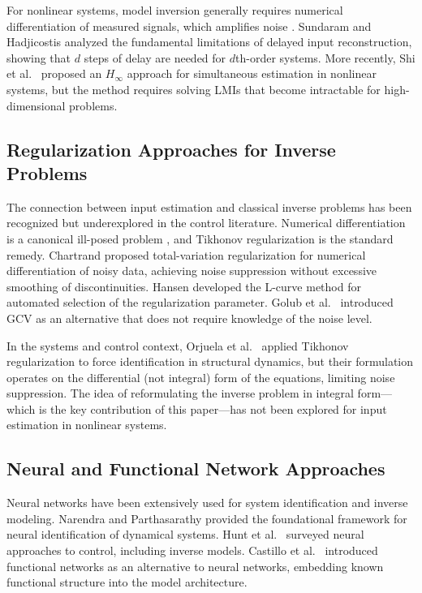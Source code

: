 \documentclass[lettersize,journal]{IEEEtran}
\begin{document}
For nonlinear systems, model inversion generally requires numerical differentiation of measured signals, which amplifies noise \cite{chartrand2011}. Sundaram and Hadjicostis \cite{sundaram2007} analyzed the fundamental limitations of delayed input reconstruction, showing that $d$ steps of delay are needed for $d$th-order systems. More recently, Shi et al.\ \cite{shi2016} proposed an $H_\infty$ approach for simultaneous estimation in nonlinear systems, but the method requires solving LMIs that become intractable for high-dimensional problems.

\subsection{Regularization Approaches for Inverse Problems}

The connection between input estimation and classical inverse problems has been recognized but underexplored in the control literature. Numerical differentiation is a canonical ill-posed problem \cite{hanke2001}, and Tikhonov regularization \cite{tikhonov1977} is the standard remedy. Chartrand \cite{chartrand2011} proposed total-variation regularization for numerical differentiation of noisy data, achieving noise suppression without excessive smoothing of discontinuities. Hansen \cite{hansen1998, hansen1992} developed the L-curve method for automated selection of the regularization parameter. Golub et al.\ \cite{golub1979} introduced GCV as an alternative that does not require knowledge of the noise level.

In the systems and control context, Orjuela et al.\ \cite{orjuela2019} applied Tikhonov regularization to force identification in structural dynamics, but their formulation operates on the differential (not integral) form of the equations, limiting noise suppression. The idea of reformulating the inverse problem in integral form---which is the key contribution of this paper---has not been explored for input estimation in nonlinear systems.

\subsection{Neural and Functional Network Approaches}

Neural networks have been extensively used for system identification and inverse modeling. Narendra and Parthasarathy \cite{narendra1990} provided the foundational framework for neural identification of dynamical systems. Hunt et al.\ \cite{hunt1996} surveyed neural approaches to control, including inverse models. Castillo et al.\ \cite{castillo1998} introduced functional networks as an alternative to neural networks, embedding known functional structure into the model architecture.
\end{document}
